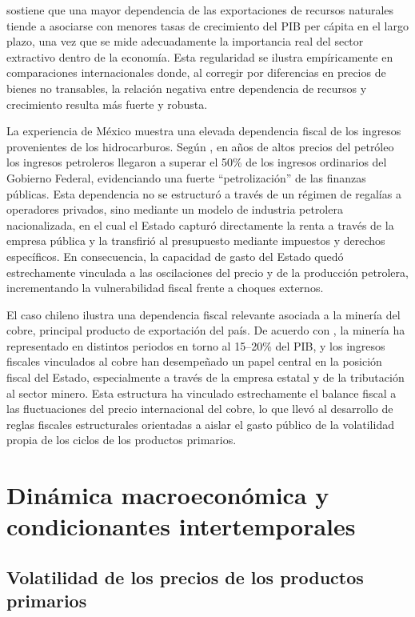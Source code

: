 \documentclass[../../TFM.tex]{subfiles}
\begin{document}
	\textcite{Brckner2010} sostiene que una mayor dependencia de las exportaciones de recursos naturales tiende a asociarse con menores tasas de crecimiento del PIB per cápita en el largo plazo, una vez que se mide adecuadamente la importancia real del sector extractivo dentro de la economía. Esta regularidad se ilustra empíricamente en comparaciones internacionales donde, al corregir por diferencias en precios de bienes no transables, la relación negativa entre dependencia de recursos y crecimiento resulta más fuerte y robusta.
	
	La experiencia de México muestra una elevada dependencia fiscal de los ingresos provenientes de los hidrocarburos. Según \textcite{GarciaMorales2014}, en años de altos precios del petróleo los ingresos petroleros llegaron a superar el 50\% de los ingresos ordinarios del Gobierno Federal, evidenciando una fuerte “petrolización” de las finanzas públicas. Esta dependencia no se estructuró a través de un régimen de regalías a operadores privados, sino mediante un modelo de industria petrolera nacionalizada, en el cual el Estado capturó directamente la renta a través de la empresa pública y la transfirió al presupuesto mediante impuestos y derechos específicos. En consecuencia, la capacidad de gasto del Estado quedó estrechamente vinculada a las oscilaciones del precio y de la producción petrolera, incrementando la vulnerabilidad fiscal frente a choques externos.
	
	El caso chileno ilustra una dependencia fiscal relevante asociada a la minería del cobre, principal producto de exportación del país. De acuerdo con \textcite{DeGregorio2004}, la minería ha representado en distintos periodos en torno al 15–20\% del PIB, y los ingresos fiscales vinculados al cobre han desempeñado un papel central en la posición fiscal del Estado, especialmente a través de la empresa estatal y de la tributación al sector minero. Esta estructura ha vinculado estrechamente el balance fiscal a las fluctuaciones del precio internacional del cobre, lo que llevó al desarrollo de reglas fiscales estructurales orientadas a aislar el gasto público de la volatilidad propia de los ciclos de los productos primarios.
	
	\section{Dinámica macroeconómica y condicionantes intertemporales}
	\label{sec:dinamica-macroeconomica}
	
	\subsection{Volatilidad de los precios de los productos primarios}
	\label{subsec:volatilidad-precios}
	
\end{document}
